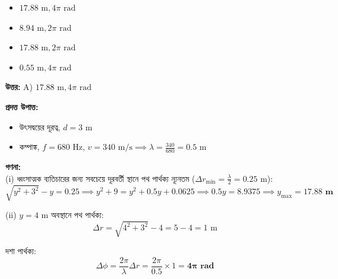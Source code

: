 \documentclass[12pt, a4paper]{article}
\begin{document}
\begin{itemize}[label={}, leftmargin=1cm, itemsep=0.5em]
    \item[\textbf{A)}] $17.88\text{ m}, 4\pi\text{ rad}$
    \item[\textbf{B)}] $8.94\text{ m}, 2\pi\text{ rad}$
    \item[\textbf{C)}] $17.88\text{ m}, 2\pi\text{ rad}$
    \item[\textbf{D)}] $0.55\text{ m}, 4\pi\text{ rad}$
\end{itemize}

\vspace{0.5em}
\begin{tcolorbox}[answerbox]
    \textbf{\color{success} উত্তর:} A) $17.88\text{ m}, 4\pi\text{ rad}$
\end{tcolorbox}
\vspace{1em}

\begin{tcolorbox}[solutionbox={সমাধান (Solution)}]
    \noindent
    \textbf{প্রদত্ত উপাত্ত:}
    \begin{itemize}[leftmargin=1.5em, itemsep=0.2em]
        \item উৎসদ্বয়ের দূরত্ব, $d = 3\text{ m}$
        \item কম্পাঙ্ক, $f = 680\text{ Hz}$, $v = 340\text{ m/s} \implies \lambda = \frac{340}{680} = 0.5\text{ m}$
    \end{itemize}

    \vspace{0.6em}
    \noindent\textbf{গণনা:} \\
    (i) ধ্বংসাত্মক ব্যতিচারের জন্য সবচেয়ে দূরবর্তী স্থানে পথ পার্থক্য ন্যূনতম ($\Delta r_{\text{min}} = \frac{\lambda}{2} = 0.25\text{ m}$):
    \[ \sqrt{y^2 + 3^2} - y = 0.25 \implies y^2 + 9 = y^2 + 0.5y + 0.0625 \implies 0.5y = 8.9375 \implies y_{\text{max}} = \mathbf{17.88\text{ m}} \]
    
    (ii) $y = 4\text{ m}$ অবস্থানে পথ পার্থক্য:
    \[ \Delta r = \sqrt{4^2 + 3^2} - 4 = 5 - 4 = 1\text{ m} \]
    
    দশা পার্থক্য:
    \[ \Delta \phi = \frac{2\pi}{\lambda} \Delta r = \frac{2\pi}{0.5} \times 1 = \mathbf{4\pi\text{ rad}} \]
\end{tcolorbox}
\end{document}
